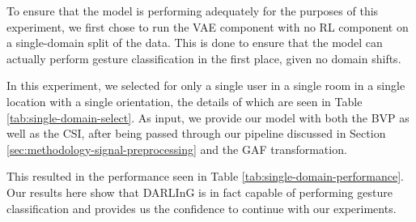 To ensure that the model is performing adequately for the purposes of this experiment, we first chose to run the VAE component with no RL component on a single-domain split of the data.
This is done to ensure that the model can actually perform gesture classification in the first place, given no domain shifts.

In this experiment, we selected for only a single user in a single room in a single location with a single orientation, the details of which are seen in Table \ref{tab:single-domain-select}.
As input, we provide our model with both the BVP as well as the CSI, after being passed through our pipeline discussed in Section \ref{sec:methodology-signal-preprocessing} and the GAF transformation.

This resulted in the performance seen in Table \ref{tab:single-domain-performance}.
Our results here show that DARLInG is in fact capable of performing gesture classification and provides us the confidence to continue with our experiments.

